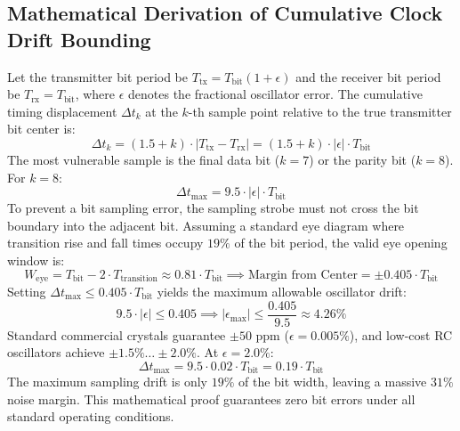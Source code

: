 \documentclass[11pt,a4paper]{article}
\begin{document}
\subsection{Mathematical Derivation of Cumulative Clock Drift Bounding}
Let the transmitter bit period be $T_{\text{tx}} = T_{\text{bit}} (1 + \epsilon)$ and the receiver bit period be $T_{\text{rx}} = T_{\text{bit}}$, where $\epsilon$ denotes the fractional oscillator error. The cumulative timing displacement $\Delta t_k$ at the $k$-th sample point relative to the true transmitter bit center is:
\begin{equation}
    \Delta t_k = \left( 1.5 + k \right) \cdot |T_{\text{tx}} - T_{\text{rx}}| = \left( 1.5 + k \right) \cdot |\epsilon| \cdot T_{\text{bit}}
\end{equation}
The most vulnerable sample is the final data bit ($k=7$) or the parity bit ($k=8$). For $k=8$:
\begin{equation}
    \Delta t_{\max} = 9.5 \cdot |\epsilon| \cdot T_{\text{bit}}
\end{equation}
To prevent a bit sampling error, the sampling strobe must not cross the bit boundary into the adjacent bit. Assuming a standard eye diagram where transition rise and fall times occupy $19\%$ of the bit period, the valid eye opening window is:
\begin{equation}
    W_{\text{eye}} = T_{\text{bit}} - 2 \cdot T_{\text{transition}} \approx 0.81 \cdot T_{\text{bit}} \implies \text{Margin from Center} = \pm 0.405 \cdot T_{\text{bit}}
\end{equation}
Setting $\Delta t_{\max} \le 0.405 \cdot T_{\text{bit}}$ yields the maximum allowable oscillator drift:
\begin{equation}
    9.5 \cdot |\epsilon| \le 0.405 \implies |\epsilon_{\max}| \le \frac{0.405}{9.5} \approx 4.26\%
\end{equation}
Standard commercial crystals guarantee $\pm 50\text{ ppm}$ ($\epsilon = 0.005\%$), and low-cost RC oscillators achieve $\pm 1.5\% \dots \pm 2.0\%$. At $\epsilon = 2.0\%$:
\begin{equation}
    \Delta t_{\max} = 9.5 \cdot 0.02 \cdot T_{\text{bit}} = 0.19 \cdot T_{\text{bit}}
\end{equation}
The maximum sampling drift is only $19\%$ of the bit width, leaving a massive $31\%$ noise margin. This mathematical proof guarantees zero bit errors under all standard operating conditions.

\end{document}

